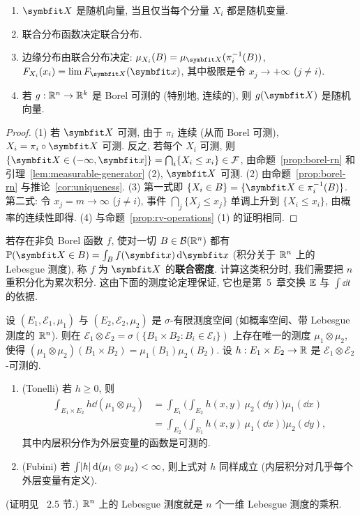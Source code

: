 \begin{proposition}\label{prop:random-vector}
\begin{enumerate}
\item $\rvec{X}$ 是随机向量, 当且仅当每个分量 $X_i$ 都是随机变量.
\item 联合分布函数决定联合分布.
\item 边缘分布由联合分布决定: $\mu_{X_i}(B)=\mu_{\rvec{X}}(\pi_i^{-1}(B))$, $F_{X_i}(x_i)=\lim F_{\rvec{X}}(\rvec{x})$, 其中极限是令 $x_j\to+\infty$ ($j\ne i$).
\item 若 $g:\mathbb{R}^n\to\mathbb{R}^k$ 是 Borel 可测的 (特别地, 连续的), 则 $g(\rvec{X})$ 是随机向量.
\end{enumerate}
\end{proposition}

\begin{proof}
(1) 若 $\rvec{X}$ 可测, 由于 $\pi_i$ 连续 (从而 Borel 可测), $X_i=\pi_i\circ\rvec{X}$ 可测. 反之, 若每个 $X_i$ 可测, 则 $\{\rvec{X}\in(-\infty,\rvec{x}]\}=\bigcap_i\{X_i\le x_i\}\in\mathcal{F}$, 由命题~\ref{prop:borel-rn} 和引理~\ref{lem:measurable-generator} (2), $\rvec{X}$ 可测.
(2) 由命题~\ref{prop:borel-rn} 与推论~\ref{cor:uniqueness}.
(3) 第一式即 $\{X_i\in B\}=\{\rvec{X}\in\pi_i^{-1}(B)\}$. 第二式: 令 $x_j=m\to\infty$ ($j\ne i$), 事件 $\bigcap_j\{X_j\le x_j\}$ 单调上升到 $\{X_i\le x_i\}$, 由概率的连续性即得.
(4) 与命题~\ref{prop:rv-operations} (1) 的证明相同.
\end{proof}

若存在非负 Borel 函数 $f$, 使对一切 $B\in\mathcal{B}(\mathbb{R}^n)$ 都有 $\P(\rvec{X}\in B)=\int_B f(\rvec{x})\dd\rvec{x}$ (积分关于 $\mathbb{R}^n$ 上的 Lebesgue 测度), 称 $f$ 为 $\rvec{X}$ 的\textbf{联合密度}. 计算这类积分时, 我们需要把 $n$ 重积分化为累次积分. 这由下面的测度论定理保证, 它也是第~5~章交换 $\mathbb{E}$ 与 $\int\dd t$ 的依据.

\begin{theorem}\label{thm:fubini}
设 $(E_1,\mathcal{E}_1,\mu_1)$ 与 $(E_2,\mathcal{E}_2,\mu_2)$ 是 $\sigma$-有限测度空间 (如概率空间、带 Lebesgue 测度的 $\mathbb{R}^n$). 则在 $\mathcal{E}_1\otimes\mathcal{E}_2=\sigma(\{B_1\times B_2: B_i\in\mathcal{E}_i\})$ 上存在唯一的测度 $\mu_1\otimes\mu_2$, 使得 $(\mu_1\otimes\mu_2)(B_1\times B_2)=\mu_1(B_1)\mu_2(B_2)$. 设 $h:E_1\times E_2\to\mathbb{R}$ 是 $\mathcal{E}_1\otimes\mathcal{E}_2$-可测的.
\begin{enumerate}
\item (Tonelli) 若 $h\ge0$, 则
\begin{align*}
\int_{E_1\times E_2}h\dd(\mu_1\otimes\mu_2)&=\int_{E_1}\Big(\int_{E_2}h(x,y)\,\mu_2(\dd y)\Big)\mu_1(\dd x)\\
&=\int_{E_2}\Big(\int_{E_1}h(x,y)\,\mu_1(\dd x)\Big)\mu_2(\dd y),
\end{align*}
其中内层积分作为外层变量的函数是可测的.
\item (Fubini) 若 $\int\lvert h\rvert\mathop{}\!\mathrm{d}(\mu_1\otimes\mu_2)<\infty$, 则上式对 $h$ 同样成立 (内层积分对几乎每个外层变量有定义).
\end{enumerate}
(证明见~\cite{folland} 2.5 节.) $\mathbb{R}^n$ 上的 Lebesgue 测度就是 $n$ 个一维 Lebesgue 测度的乘积.
\end{theorem}

